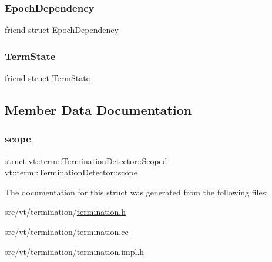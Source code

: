 \mbox{\label{structvt_1_1term_1_1_termination_detector_aee175d34803c93c65e4323ab28f04088}} 
\subsubsection{\texorpdfstring{Epoch\+Dependency}{EpochDependency}}
{\footnotesize\ttfamily friend struct \hyperlink{structvt_1_1term_1_1_epoch_dependency}{Epoch\+Dependency}\hspace{0.3cm}{\ttfamily [friend]}}

\mbox{\label{structvt_1_1term_1_1_termination_detector_a628421bb882cfbd05876660b5b7dc150}} 
\subsubsection{\texorpdfstring{Term\+State}{TermState}}
{\footnotesize\ttfamily friend struct \hyperlink{structvt_1_1term_1_1_term_state}{Term\+State}\hspace{0.3cm}{\ttfamily [friend]}}



\subsection{Member Data Documentation}
\mbox{\label{structvt_1_1term_1_1_termination_detector_a9027001de957f59eb36bb5784f7af4b1}} 
\subsubsection{\texorpdfstring{scope}{scope}}
{\footnotesize\ttfamily struct \hyperlink{structvt_1_1term_1_1_termination_detector_1_1_scoped}{vt\+::term\+::\+Termination\+Detector\+::\+Scoped}  vt\+::term\+::\+Termination\+Detector\+::scope}



The documentation for this struct was generated from the following files\+:\begin{DoxyCompactItemize}
\item 
src/vt/termination/\hyperlink{termination_8h}{termination.\+h}\item 
src/vt/termination/\hyperlink{termination_8cc}{termination.\+cc}\item 
src/vt/termination/\hyperlink{termination_8impl_8h}{termination.\+impl.\+h}\end{DoxyCompactItemize}
